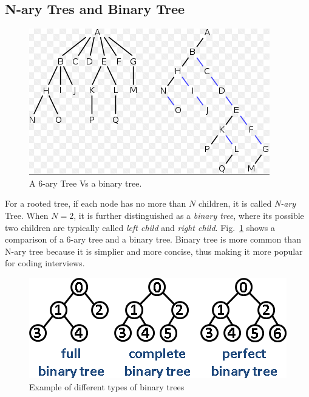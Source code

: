 \documentclass[../main.tex]{subfiles}
\begin{document}
\subsection{N-ary Tres and Binary Tree}
\begin{figure}[!ht]
    \centering
    \includegraphics[width = 0.6\columnwidth]{fig/n-ary_binary_tree.png}
    \caption{A 6-ary Tree Vs a binary tree.}
    \label{fig:nary_vs_binary}
\end{figure}
For a rooted tree, if each node has no more than $N$ children, it is called \textit{N-ary} Tree. When $N=2$, it is  further distinguished as a \textit{binary tree}, where its possible two children are typically called \textit{left child} and \textit{right child}. Fig.~\ref{fig:nary_vs_binary} shows a comparison of a 6-ary tree and a binary tree. Binary tree is more common than N-ary tree because it is simplier and more concise, thus making it more popular for coding interviews.  

\begin{figure}[!ht]
    \centering
    \includegraphics[width = 0.8\columnwidth]{fig/full_complete_perfect_binary_tree.png}
    \caption{Example of different types of binary trees}
    \label{fig:binary_tree_type}
\end{figure}
\end{document}
